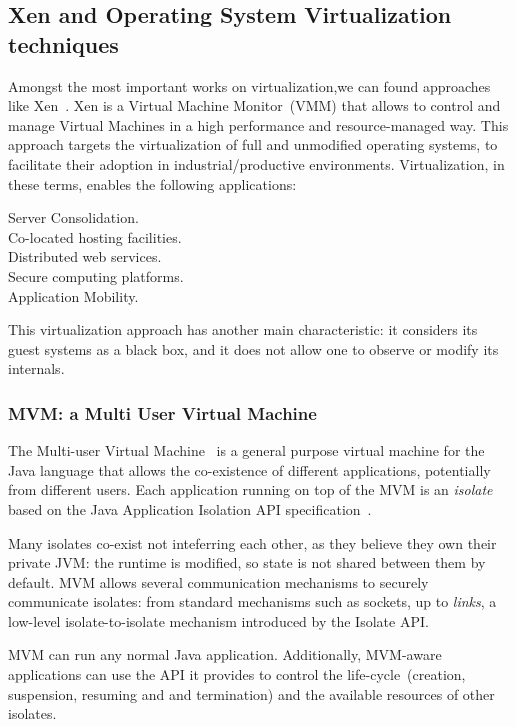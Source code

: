 \subsection*{Xen and Operating System Virtualization techniques}
Amongst the most important works on virtualization,we can found approaches like Xen~\cite{Chis07xen}. Xen is a Virtual Machine Monitor~(VMM) that allows to control and manage Virtual Machines in a high performance and resource-managed way. This approach targets the virtualization of full and unmodified operating systems, to facilitate their adoption in industrial/productive environments. Virtualization, in these terms, enables the following applications:

\begin{description}

\item[Server Consolidation.]
\item[Co-located hosting facilities.]
\item[Distributed web services.]
\item[Secure computing platforms.]
\item[Application Mobility.]

\end{description}

This virtualization approach has another main characteristic: it considers its guest systems as a black box, and it does not allow one to observe or modify its internals.

\subsubsection*{MVM: a Multi User Virtual Machine}
The Multi-user Virtual Machine~\cite{Czaj03a,Czaj01a} is a general purpose virtual machine for the Java language that allows the co-existence of different applications, potentially from different users. Each application running on top of the MVM is an \emph{isolate} based on the Java Application Isolation API specification~\cite{JSR121}.

Many isolates co-exist not inteferring each other, as they believe they own their private JVM: the runtime is modified, so state is not shared between them by default. MVM allows several communication mechanisms to securely communicate isolates: from standard mechanisms such as sockets, up to \emph{links}, a low-level isolate-to-isolate mechanism introduced by the Isolate API.

MVM can run any normal Java application. Additionally, MVM-aware applications can use the API it provides to control the life-cycle~(\eg creation, suspension, resuming and and termination) and the available resources of other isolates.

